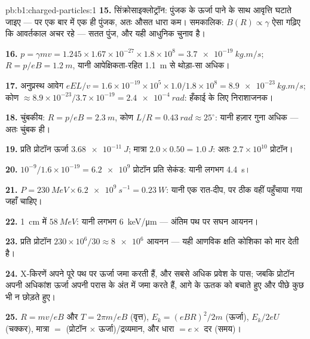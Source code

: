 \begin{solution}{pb:b1:charged-particles:1}
\textbf{15.} सिंक्रोसाइक्लोट्रॉन: पुंजक के ऊर्जा पाने के साथ आवृत्ति घटाते
जाइए --- पर एक बार में एक ही पुंजक, अतः औसत धारा कम। समकालिक: $B(R) \propto \gamma$
ऐसा गढ़िए कि आवर्तकाल अचर रहे --- सतत पुंज, और यही आधुनिक चुनाव है।

\textbf{16.} $p = \gamma mv = 1.245 \times 1.67\times10^{-27} \times 1.8\times10^8
= \qty{3.7e-19}{kg.m/s}$; $R = p/eB = \qty{1.2}{m}$, यानी
आपेक्षिकता-रहित \qty{1.1}{m} से थोड़ा-सा अधिक।

\textbf{17.} अनुप्रस्थ आवेग $eEL/v = 1.6\times10^{-19} \times 10^5 \times
1.0/1.8\times10^8 = \qty{8.9e-23}{kg.m/s}$; कोण $\approx 8.9\times10^{-23}/
3.7\times10^{-19} = \qty{2.4e-4}{rad}$: हँकाई के लिए निराशाजनक।

\textbf{18.} चुंबकीय: $R = p/eB = \qty{2.3}{m}$, कोण $L/R = \qty{0.43}{rad}
\approx 25^\circ$: यानी हज़ार गुना अधिक --- अतः चुंबक ही।

\textbf{19.} प्रति प्रोटॉन ऊर्जा $\qty{3.68e-11}{J}$; मात्रा $2.0 \times 0.50 =
\qty{1.0}{J}$: अतः $2.7\times10^{10}$ प्रोटॉन।

\textbf{20.} $10^{-9}/1.6\times10^{-19} = \num{6.2e9}$ प्रोटॉन प्रति सेकंड: यानी लगभग
\qty{4.4}{s}।

\textbf{21.} $P = \qty{230}{MeV} \times \qty{6.2e9}{s^{-1}} = \qty{0.23}{W}$:
यानी एक रात-दीप, पर ठीक वहीं पहुँचाया गया जहाँ चाहिए।

\textbf{22.} \qty{1}{cm} में $\qty{58}{MeV}$: यानी लगभग
\qty{6}{keV/\micro m} --- अंतिम पथ पर सघन आयनन।

\textbf{23.} प्रति प्रोटॉन $230\times10^6/30 \approx \num{8e6}$ आयनन ---
यही आणविक क्षति कोशिका को मार देती है।

\textbf{24.} X-किरणें अपने पूरे पथ पर ऊर्जा जमा करती हैं, और सबसे अधिक
प्रवेश के पास; जबकि प्रोटॉन अपनी अधिकांश ऊर्जा अपनी परास के अंत में जमा
करते हैं, आगे के ऊतक को बचाते हुए और पीछे कुछ भी न छोड़ते हुए।

\textbf{25.} $R = mv/eB$ और $T = 2\pi m/eB$ (वृत्त), $E_k = (eBR)^2/2m$
(ऊर्जा), $E_k/2eU$ (चक्कर), मात्रा $=$ (प्रोटॉन $\times$ ऊर्जा)/द्रव्यमान,
और धारा $= e \times$ दर (समय)।
\end{solution}
